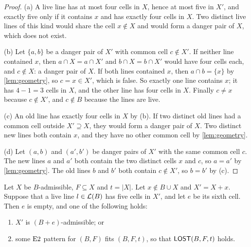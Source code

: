 \begin{proof}
(a) A live line has at most four cells in $X$, hence at most five in $X'$, and exactly five only if it
contains $x$ and has exactly four cells in $X$. Two distinct live lines of this kind would share the cell
$x\notin X$ and would form a danger pair of $X$, which does not exist.

(b) Let $\{a,b\}$ be a danger pair of $X'$ with common cell $c\notin X'$. If neither line contained $x$,
then $a\cap X=a\cap X'$ and $b\cap X=b\cap X'$ would have four cells each, and $c\notin X$: a danger pair of
$X$. If both lines contained $x$, then $a\cap b=\{x\}$ by \cref{lem:geometry}, so $c=x\in X'$, which is
false. So exactly one line contains $x$; it has $4-1=3$ cells in $X$, and the other line has four cells in
$X$. Finally $c\ne x$ because $c\notin X'$, and $c\notin B$ because the lines are live.

(c) An old line has exactly four cells in $X$ by (b). If two distinct old lines had a common cell outside
$X'\supseteq X$, they would form a danger pair of $X$. Two distinct new lines both contain $x$, and they have
no other common cell by \cref{lem:geometry}.

(d) Let $(a,b)$ and $(a',b')$ be danger pairs of $X'$ with the same common cell $c$. The new lines $a$ and
$a'$ both contain the two distinct cells $x$ and $c$, so $a=a'$ by \cref{lem:geometry}. The old lines $b$
and $b'$ both contain $c\notin X'$, so $b=b'$ by (c).
\end{proof}

\begin{lemma}[Threat]\label{lem:threat}
Let $X$ be $B$-admissible, $F\subseteq X$ and $t=|X|$. Let $x\notin B\cup X$ and $X'=X+x$. Suppose that a live
line $l\in\mathcal{L}(B)$ has five cells in $X'$, and let $e$ be its sixth cell. Then $e$ is empty, and one of the
following holds:
\begin{enumerate}[label=\textup{(\arabic*)},leftmargin=2.4em]
\item $X'$ is $(B+e)$-admissible; or
\item some $\mathrm{E2}$ pattern for $(B,F)$ fits $(B,F,t)$, so that $\mathsf{LOST}(B,F,t)$ holds.
\end{enumerate}
\end{lemma}

